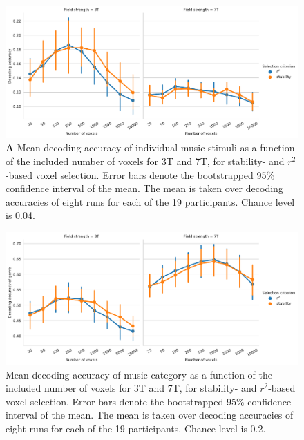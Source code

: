 \begin{figure}[H]
  \centering
    \includegraphics[width=\linewidth]{pics/decoding_selection.pdf}

	\caption{\textbf{A} Mean decoding accuracy of individual music stimuli as a function of
  the included number of voxels for 3T and 7T, for stability- and
  $r^2$-based voxel selection. Error bars denote the bootstrapped 95\%
  confidence interval of the mean. The mean is taken over decoding
  accuracies of eight runs for each of the 19 participants. Chance level is
    0.04.
}
 \label{fig:decoding_accuracy_stimulus_selection}
\end{figure}

\begin{figure}[H]
  \centering
  \includegraphics[width=\linewidth]{pics/decoding_genre_selection.pdf}

  \caption{Mean decoding accuracy of music category as a function of
  the included number of voxels for 3T and 7T, for stability- and
  $r^2$-based voxel selection. Error bars denote the bootstrapped 95\%
  confidence interval of the mean. The mean is taken over decoding
  accuracies of eight runs for each of the 19 participants. Chance level is 0.2.}

 \label{fig:decoding_accuracy_selection}
\end{figure}





